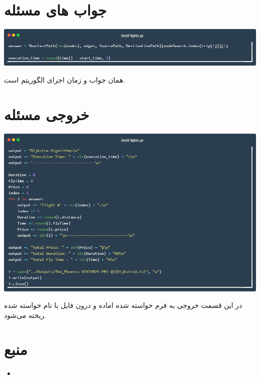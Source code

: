 \documentclass[12pt, dvipsnames, svgnames, x11names,]{article}
\begin{document}
	\section{جواب های مسئله} \label{answer_ready}

		{\includegraphics[width=14cm]{images/code11}} \par
		{\normalsize 
		 همان جواب و  زمان اجرای الگوریتم است.
		}




	\section{خروجی مسئله} \label{output}

		{\includegraphics[width=14cm]{images/code12}} \par
		{\normalsize 
		در این قسمت خروجی به فرم خواسته شده اماده و درون فایل با نام خواسته شده ریخته می‌شود.
		}






	\section{منبع} \label{resource}
	
		\begin{itemize}
			
			\item 
			\textbf{}

			
		\end{itemize}

		
	
\end{document}
